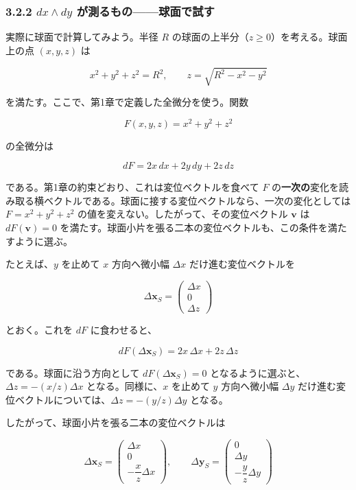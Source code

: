 \documentclass[a4paper,12pt,openany]{book}
\begin{document}
\hypertarget{dx-wedge-dy-ux304cux6e2cux308bux3082ux306eux7403ux9762ux3067ux8a66ux3059}{%
\subsubsection{\texorpdfstring{3.2.2 \(dx \wedge dy\)
が測るもの——球面で試す}{3.2.2 dx \textbackslash wedge dy が測るもの——球面で試す}}\label{dx-wedge-dy-ux304cux6e2cux308bux3082ux306eux7403ux9762ux3067ux8a66ux3059}}

実際に球面で計算してみよう。半径 \(R\)
の球面の上半分（\(z \ge 0\)）を考える。球面上の点 \((x,y,z)\) は

\[x^2+y^2+z^2=R^2,\qquad z=\sqrt{R^2-x^2-y^2}\]

を満たす。ここで、第1章で定義した全微分を使う。関数

\[F(x,y,z)=x^2+y^2+z^2\]

の全微分は

\[dF=2x\,dx+2y\,dy+2z\,dz\]

である。第1章の約束どおり、これは変位ベクトルを食べて \(F\)
の\textbf{一次の}変化を読み取る横ベクトルである。球面に接する変位ベクトルなら、一次の変化としては
\(F=x^2+y^2+z^2\) の値を変えない。したがって、その変位ベクトル
\(\mathbf{v}\) は \(dF(\mathbf{v})=0\)
を満たす。球面小片を張る二本の変位ベクトルも、この条件を満たすように選ぶ。

たとえば、\(y\) を止めて \(x\) 方向へ微小幅 \(\Delta x\)
だけ進む変位ベクトルを

\[\Delta\mathbf{x}_S=\begin{pmatrix}\Delta x\\[2pt]0\\[2pt]\Delta z\end{pmatrix}\]

とおく。これを \(dF\) に食わせると、

\[dF(\Delta\mathbf{x}_S)=2x\,\Delta x+2z\,\Delta z\]

である。球面に沿う方向として \(dF(\Delta\mathbf{x}_S)=0\)
となるように選ぶと、\(\Delta z=-(x/z)\Delta x\) となる。同様に、\(x\)
を止めて \(y\) 方向へ微小幅 \(\Delta y\)
だけ進む変位ベクトルについては、\(\Delta z=-(y/z)\Delta y\) となる。

したがって、球面小片を張る二本の変位ベクトルは

\[\Delta\mathbf{x}_S=\begin{pmatrix}\Delta x\\[2pt]0\\[2pt]-\dfrac{x}{z}\Delta x\end{pmatrix},\qquad
\Delta\mathbf{y}_S=\begin{pmatrix}0\\[2pt]\Delta y\\[2pt]-\dfrac{y}{z}\Delta y\end{pmatrix}\]
\end{document}
